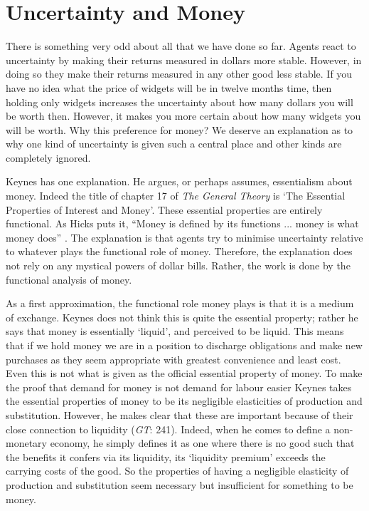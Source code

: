 \section{Uncertainty and Money}
There is something very odd about all that we have done so far. Agents react to uncertainty by making their returns measured in dollars more stable. However, in doing so they make their returns measured in any other good less stable. If you have no idea what the price of widgets will be in twelve months time, then holding only widgets increases the uncertainty about how many dollars you will be worth then. However, it makes you more certain about how many widgets you will be worth. Why this preference for money? We deserve an explanation as to why one kind of uncertainty is given such a central place and other kinds are completely ignored.

Keynes has one explanation. He argues, or perhaps assumes, essentialism about money. Indeed the title of chapter 17 of \textit{The General Theory} is `The Essential Properties of Interest and Money'. These essential properties are entirely functional. As Hicks puts it, ``Money is defined by its functions ... money is what money does'' \cite[1]{Hicks1967}. The explanation is that agents try to minimise uncertainty relative to whatever plays the functional role of money. Therefore, the explanation does not rely on any mystical powers of dollar bills. Rather, the work is done by the functional analysis of money.

As a first approximation, the functional role money plays is that it is a medium of exchange. Keynes does not think this is quite the essential property; rather he says that money is essentially `liquid', and perceived to be liquid. This means that if we hold money we are in a position to discharge obligations and make new purchases as they seem appropriate with greatest convenience and least cost. Even this is not what is given as the official essential property of money. To make the proof that demand for money is not demand for labour easier Keynes takes the essential properties of money to be its negligible elasticities of production and substitution. However, he makes clear that these are important because of their close connection to liquidity (\textit{GT}: 241). Indeed, when he comes to define a non-monetary economy, he simply defines it as one where there is no good such that the benefits it confers via its liquidity, its `liquidity premium' exceeds the carrying costs of the good. So the properties of having a negligible elasticity of production and substitution seem necessary but insufficient for something to be money.


